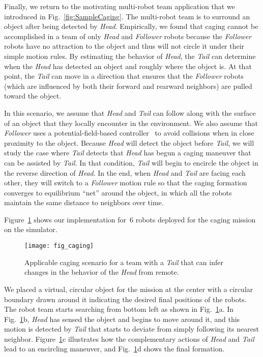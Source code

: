 \documentclass[letterpaper, 10 pt, conference]{ieeeconf}  %
\begin{document}
	Finally, we return to the motivating multi-robot team application that
	we introduced in Fig.~\ref{fig:SampleCaging}. The multi-robot team is
	to surround an object after being detected by \emph{Head}. Empirically,
	we found that caging cannot be accomplished in a team of only
	\emph{Head} and \emph{Follower} robots because the \emph{Follower}
	robots have no attraction to the object and thus will not circle it
	under their simple motion rules. By estimating the behavior of
	\emph{Head}, the \emph{Tail} can determine when the \emph{Head} has
	detected an object and roughly where the object is. At that point, the
	\emph{Tail} can move in a direction that ensures that the
	\emph{Follower} robots (which are influenced by both their forward and
	rearward neighbors) are pulled toward the object.
	
	In this scenario, we assume that \emph{Head} and \emph{Tail} can follow
	along with the surface of an object that they locally encounter in the
	environment. We also assume that \emph{Follower} uses a
	potential-field-based controller~\cite{Arkin98} to avoid collisions when
	in close proximity to the object. Because \emph{Head} will detect the
	object before \emph{Tail}, we will study the case where \emph{Tail}
	detects that \emph{Head} has begun a caging maneuver that can be
	assisted by \emph{Tail}. In that condition, \emph{Tail} will begin to
	encircle the object in the reverse direction of \emph{Head}. In the end,
	when \emph{Head} and \emph{Tail} are facing each other, they will switch
	to a \emph{Follower} motion rule so that the caging formation converges
	to equilibrium ``net'' around the object, in which all the robots
	maintain the same distance to neighbors over time.
	
	Figure~\ref{fig:caging} shows our implementation for~6 robots deployed
	for the caging mission on the simulator.
	\begin{figure}\centering
		\texttt{[image: fig\_caging]}
		\caption{Applicable caging scenario for a team with a \emph{Tail}
			that can infer changes in the behavior of the \emph{Head} from
			remote.%
		}
		\label{fig:caging}
	\end{figure}
	We placed a virtual, circular object for the mission at the center with
	a circular boundary drawn around it indicating the desired final
	positions of the robots. The robot team starts searching from bottom
	left as shown in Fig.~\ref{fig:caging}a. In Fig.~\ref{fig:caging}b,
	\emph{Head} has sensed the object and begins to move around it, and this
	motion is detected by \emph{Tail} that starts to deviate from simply
	following its nearest neighbor. Figure~\ref{fig:caging}c illustrates how
	the complementary actions of \emph{Head} and \emph{Tail} lead to an
	encircling maneuver, and Fig.~\ref{fig:caging}d shows the final
	formation.
	
\end{document}
